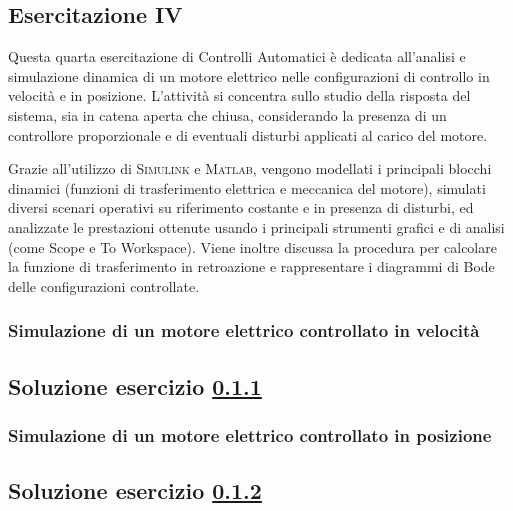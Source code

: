 \documentclass[../main.tex]{subfiles}
\begin{document}
\clearpage
\thispagestyle{empty}
\subsection{Esercitazione IV}

Questa quarta esercitazione di Controlli Automatici è dedicata all’analisi e simulazione dinamica di un motore elettrico nelle configurazioni di controllo in velocità e in posizione. L’attività si concentra sullo studio della risposta del sistema, sia in catena aperta che chiusa, considerando la presenza di un controllore proporzionale e di eventuali disturbi applicati al carico del motore.

Grazie all’utilizzo di \textsc{Simulink} e \textsc{Matlab}, vengono modellati i principali blocchi dinamici (funzioni di trasferimento elettrica e meccanica del motore), simulati diversi scenari operativi su riferimento costante e in presenza di disturbi, ed analizzate le prestazioni ottenute usando i principali strumenti grafici e di analisi (come Scope e To Workspace). Viene inoltre discussa la procedura per calcolare la funzione di trasferimento in retroazione e rappresentare i diagrammi di Bode delle configurazioni controllate.

\vspace*{1cm}
\subsubsection{Simulazione di un motore elettrico controllato in velocità}
\label{lab41}

\subsection*{Soluzione esercizio \ref{lab41}}


\vspace*{1cm}
\subsubsection{Simulazione di un motore elettrico controllato in posizione}
\label{lab42}

\subsection*{Soluzione esercizio \ref{lab42}}
\end{document}
